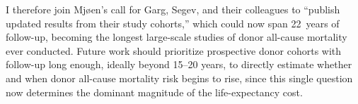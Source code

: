 
I therefore join Mjøen's call\cite{mjoeen_reply} for Garg,\cite{garg2012} Segev,\cite{segev_perioperative_2010} and their colleagues to ``publish updated results from their study cohorts,'' which could now span 22~years of follow-up, becoming the longest large-scale studies of donor all-cause mortality ever conducted. Future work should prioritize prospective donor cohorts with follow-up long enough, ideally beyond 15--20 years, to directly estimate whether and when donor all-cause mortality risk begins to rise, since this single question now determines the dominant magnitude of the life-expectancy cost.